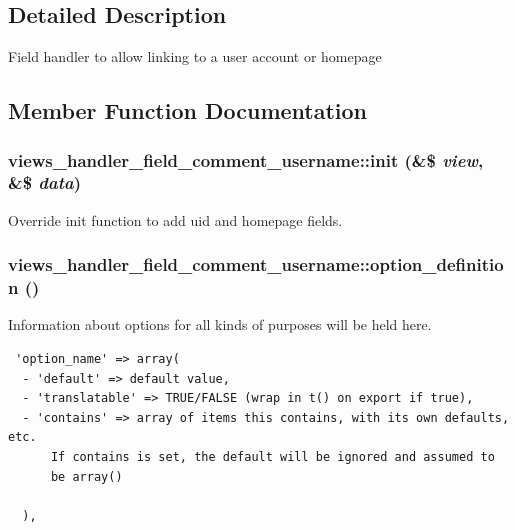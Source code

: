\subsection{Detailed Description}
Field handler to allow linking to a user account or homepage 

\subsection{Member Function Documentation}
\hypertarget{classviews__handler__field__comment__username_675e72d8f097a5d645459fab6943bac6}{
\subsubsection[{init}]{\setlength{\rightskip}{0pt plus 5cm}views\_\-handler\_\-field\_\-comment\_\-username::init (\&\$ {\em view}, \/  \&\$ {\em data})}}
\label{classviews__handler__field__comment__username_675e72d8f097a5d645459fab6943bac6}


Override init function to add uid and homepage fields. \hypertarget{classviews__handler__field__comment__username_6a9ac27498f1ddce0a8d680d6d33b7c5}{
\subsubsection[{option\_\-definition}]{\setlength{\rightskip}{0pt plus 5cm}views\_\-handler\_\-field\_\-comment\_\-username::option\_\-definition ()}}
\label{classviews__handler__field__comment__username_6a9ac27498f1ddce0a8d680d6d33b7c5}


Information about options for all kinds of purposes will be held here. 

\begin{Code}\begin{verbatim} 'option_name' => array(
  - 'default' => default value,
  - 'translatable' => TRUE/FALSE (wrap in t() on export if true),
  - 'contains' => array of items this contains, with its own defaults, etc.
      If contains is set, the default will be ignored and assumed to
      be array()

  ),
\end{verbatim}
\end{Code}

